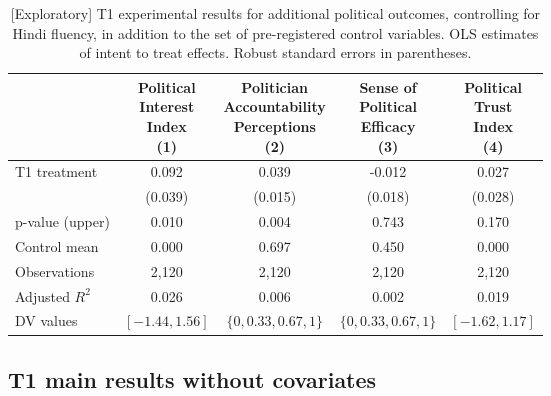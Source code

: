 \documentclass[
  11.5pt,
]{article}
\begin{document}
\begin{table}[!h]

\caption{\label{tab:unnamed-chunk-59}[Exploratory] T1 experimental results for additional political outcomes, controlling for Hindi fluency, in addition to the set of pre-registered control variables. OLS estimates of intent to treat effects. Robust standard errors in parentheses.}
\centering
\begin{tabular}[t]{lcccc}
\toprule
 & \makecell[c]{Political\\ Interest\\ Index \\(1)} & \makecell[c]{Politician\\ Accountability\\ Perceptions \\(2)} & \makecell[c]{Sense of\\ Political\\ Efficacy \\(3)} & \makecell[c]{Political\\ Trust\\ Index \\(4)}\\
\midrule
T1 treatment & 0.092 & 0.039 & -0.012 & 0.027\\
 & (0.039) & (0.015) & (0.018) & (0.028)\\
\midrule
p-value (upper) & 0.010 & 0.004 & 0.743 & 0.170\\
Control mean & 0.000 & 0.697 & 0.450 & 0.000\\
Observations & 2,120 & 2,120 & 2,120 & 2,120\\
Adjusted $R^2$ & 0.026 & 0.006 & 0.002 & 0.019\\
DV values & $[-1.44, 1.56]$ & $\{0, 0.33, 0.67, 1\}$ & $\{0, 0.33, 0.67, 1\}$ & $[-1.62, 1.17]$\\
\bottomrule
\end{tabular}
\end{table}

\clearpage

\hypertarget{t1-main-results-without-covariates}{%
\subsection{T1 main results without
covariates}\label{t1-main-results-without-covariates}}
\end{document}
